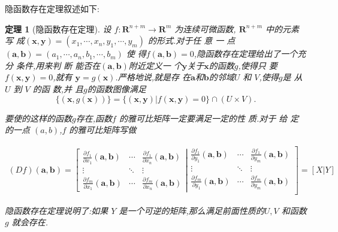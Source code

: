 \documentclass[a4paper, 12pt]{article} %
\newtheorem*{adtheorem}{定理}
\newenvironment{theorem}
{\bigskip\begin{mdframed}[backgroundcolor=gray!40,rightline=false,leftline=false,topline=false,bottomline=false]\begin{adtheorem}}
    {\end{adtheorem}\end{mdframed}\bigskip}
\begin{document}
隐函数存在定理叙述如下:
\begin{theorem}[隐函数存在定理]
  设 $ f:\mathbf{R}^{n+m}\rightarrow\mathbf{R}^m$ 为连续可微函数, $
  \mathbf{R}^{n+m}$ 中的元素写 成$
  \mathbf{(x,y)}=(x_1,\cdots,x_n,y_1,\cdots,y_m)$ 的形式.对于任
  意 一 点$ (\mathbf{a,b}) = (a_{1},\cdots, a_{n}, b_{1},\cdots,b_m)$
  使 得$ f(\mathbf{a,b}) = 0$,隐函数存在定理给出了一个充分 条件,用来判
  断 能否在$ (\mathbf{a,b})$附近定义一 个$ \mathbf{y}$关于$
  \mathbf{x}$的函数$ g$,使得只 要$ f(\mathbf{x,y})=0$,就有 $
  \mathbf{y}=g(\mathbf{x})$.严格地说,就是存 在$ \mathbf{a}$和$
  \mathbf{b}$的邻域$ U$ 和 $ V$,使得$ g$是 从 $ U$ 到 $ V$ 的函
  数,并 且$ g$的函数图像满足
$$
\{(\mathbf{x},g(\mathbf{x}))\}=\{ (\mathbf{x},\mathbf{y}) |
f(\mathbf{x},\mathbf{y}) =0 \}\cap(U\times V).
$$

要使的这样的函数$ g$存在,函数$ f$ 的雅可比矩阵一定要满足一定的性
质.对于 给 定的一点 $ (a,b)$,$ f$ 的雅可比矩阵写做

\begin{align*}
  (Df)(\mathbf{a},\mathbf{b})=\left[\begin{matrix}\frac{\partial
        f_1}{\partial x_1}(\mathbf{a},\mathbf{b}) &
      \cdots&\frac{\partial f_1}{\partial
        x_n}(\mathbf{a},\mathbf{b})\\ \vdots&\ddots&\vdots\\
      \frac{\partial f_m}{\partial
        x_1}(\mathbf{a},\mathbf{b})&\cdots&\frac{\partial
        f_m}{\partial
        x_n}(\mathbf{a},\mathbf{b}) \end{matrix}\right|\left. \begin{matrix}
      \frac{\partial f_1}{\partial y_1}(\mathbf{a},\mathbf{b}) &
      \cdots & \frac{\partial f_1}{\partial
        y_m}(\mathbf{a},\mathbf{b})\\ \vdots & \ddots & \vdots\\
      \frac{\partial f_m}{\partial y_1}(\mathbf{a},\mathbf{b}) &
      \cdots & \frac{\partial f_m}{\partial
        y_m}(\mathbf{a},\mathbf{b})\\ \end{matrix}\right]=[X|Y]
\end{align*}

隐函数存在定理说明了:如果 $ Y$ 是一个可逆的矩阵,那么满足前面性质的$
U,V$ 和函数 $ g$ 就会存在.
\end{theorem}
\end{document}

